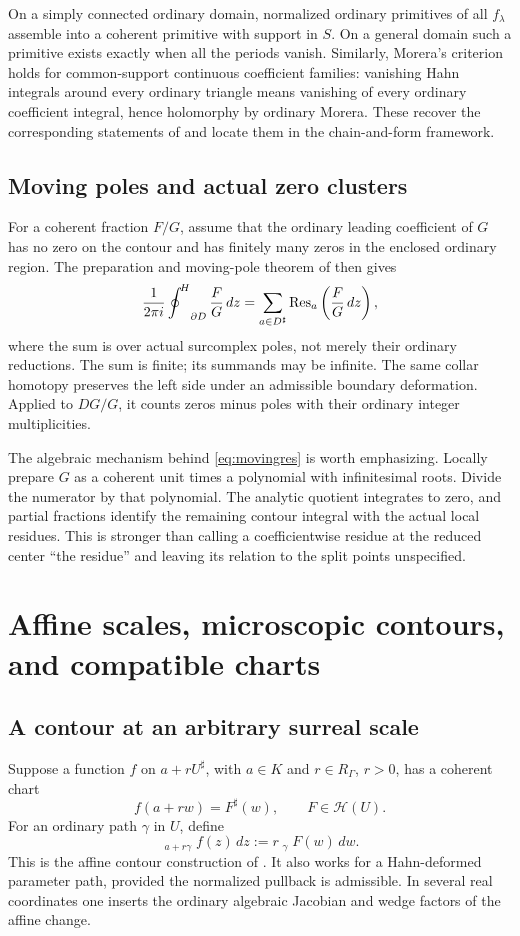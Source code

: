 \documentclass[11pt,letterpaper]{article}
\theoremstyle{definition}
\theoremstyle{remark}
\newcommand{\HH}{\mathcal H}\newcommand{\A}{\mathscr A}\newcommand{\OO}{\mathcal O}
\newcommand{\HInt}{\mathop{\int^{\!H}}\nolimits}
\newcommand{\HCoint}{\mathop{\oint^{\!H}}\nolimits}
\newcommand{\sh}{^{\sharp}}\newcommand{\dd}{\,d}
\numberwithin{equation}{section}
\begin{document}
On a simply connected ordinary domain, normalized ordinary primitives of all $f_\lambda$ assemble into a coherent primitive with support in $S$. On a general domain such a primitive exists exactly when all the periods vanish. Similarly, Morera's criterion holds for common-support continuous coefficient families: vanishing Hahn integrals around every ordinary triangle means vanishing of every ordinary coefficient integral, hence holomorphy by ordinary Morera. These recover the corresponding statements of \cite{Analysis} and locate them in the chain-and-form framework.

\subsection{Moving poles and actual zero clusters}
For a coherent fraction $F/G$, assume that the ordinary leading coefficient of $G$ has no zero on the contour and has finitely many zeros in the enclosed ordinary region. The preparation and moving-pole theorem of \cite{Analysis} then gives
\begin{equation}\label{eq:movingres}
 \frac1{2\pi i}\HCoint_{\partial D}\frac FG\dd z
 =\sum_{a\in D\sh}\Res_a\left(\frac FG\dd z\right),
\end{equation}
where the sum is over actual surcomplex poles, not merely their ordinary reductions. The sum is finite; its summands may be infinite. The same collar homotopy preserves the left side under an admissible boundary deformation. Applied to $DG/G$, it counts zeros minus poles with their ordinary integer multiplicities.

The algebraic mechanism behind \eqref{eq:movingres} is worth emphasizing. Locally prepare $G$ as a coherent unit times a polynomial with infinitesimal roots. Divide the numerator by that polynomial. The analytic quotient integrates to zero, and partial fractions identify the remaining contour integral with the actual local residues. This is stronger than calling a coefficientwise residue at the reduced center ``the residue'' and leaving its relation to the split points unspecified.

\section{Affine scales, microscopic contours, and compatible charts}\label{sec:scales}

\subsection{A contour at an arbitrary surreal scale}
Suppose a function $f$ on $a+rU\sh$, with $a\in K$ and $r\in R_\Gamma$, $r>0$, has a coherent chart
\[
 f(a+rw)=F\sh(w),\qquad F\in\HH(U).
\]
For an ordinary path $\gamma$ in $U$, define
\begin{equation}\label{eq:affineintegral}
 \HInt_{a+r\gamma}f(z)\dd z
 :=r\HInt_\gamma F(w)\dd w.
\end{equation}
This is the affine contour construction of \cite{Analysis}. It also works for a Hahn-deformed parameter path, provided the normalized pullback is admissible. In several real coordinates one inserts the ordinary algebraic Jacobian and wedge factors of the affine change.
\end{document}

